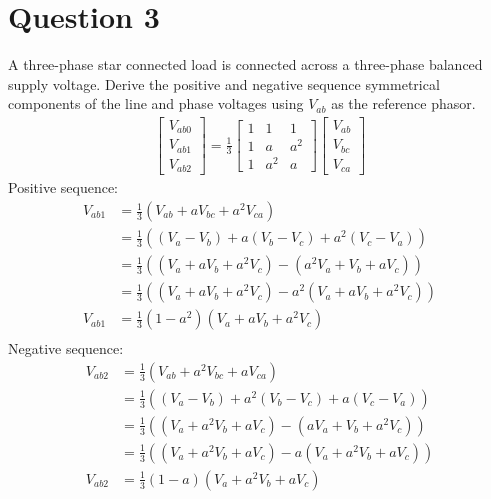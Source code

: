 \section{Question 3}
A three-phase star connected load is connected across a three-phase balanced supply voltage. Derive the positive and negative sequence symmetrical components of the line and phase voltages using $V_{ab}$ as the reference phasor.
\begin{gather}
    \begin{bmatrix}
        V_{ab0} \\
        V_{ab1} \\
        V_{ab2}
    \end{bmatrix} = \frac{1}{3}\begin{bmatrix}
        1 & 1   & 1   \\
        1 & a   & a^2   \\
        1 & a^2 & a
    \end{bmatrix}\begin{bmatrix}
        V_{ab}\\
        V_{bc}\\
        V_{ca}
    \end{bmatrix}
\end{gather}
Positive sequence:
\begin{align}
    V_{ab1} &= \frac{1}{3}\left(V_{ab}+aV_{bc}+a^2V_{ca}\right)\\
    &= \frac{1}{3}\left(\left(V_a-V_b\right)+a\left(V_b-V_c\right)+a^2\left(V_c-V_a\right)\right)\\
    &= \frac{1}{3}\left(\left(V_a+aV_b+a^2V_c\right)-\left(a^2V_a+V_b+aV_c\right)\right)\\
    &= \frac{1}{3}\left(\left(V_a+aV_b+a^2V_c\right)-a^2\left(V_a+aV_b+a^2V_c\right)\right)\\
    V_{ab1} &= \frac{1}{3}\left(1-a^2\right)\left(V_a+aV_b+a^2V_c\right)\\
\end{align}
Negative sequence:
\begin{align}
    V_{ab2} &= \frac{1}{3}\left(V_{ab}+a^2V_{bc}+aV_{ca}\right)\\
    &= \frac{1}{3}\left(\left(V_a-V_b\right)+a^2\left(V_b-V_c\right)+a\left(V_c-V_a\right)\right)\\
    &= \frac{1}{3}\left(\left(V_a+a^2V_b+aV_c\right)-\left(aV_a+V_b+a^2V_c\right)\right)\\
    &= \frac{1}{3}\left(\left(V_a+a^2V_b+aV_c\right)-a\left(V_a+a^2V_b+aV_c\right)\right)\\
    V_{ab2} &= \frac{1}{3}\left(1-a\right)\left(V_a+a^2V_b+aV_c\right)\\
\end{align}
